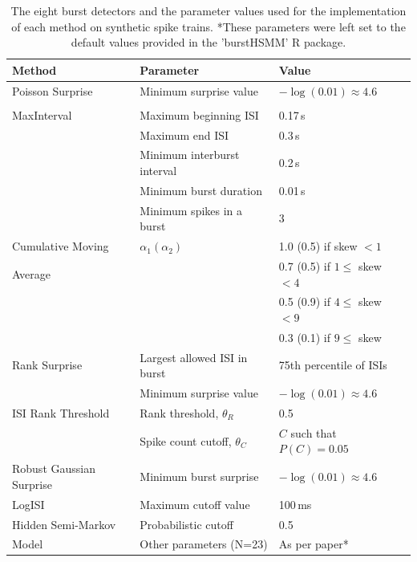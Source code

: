 \documentclass[12pt, titlepage]{article}
\begin{document}
			\begin{table}[h]
				\centering
				\begin{tabular}{|p{5cm}|l|l|}
					\hline
					Method & Parameter & Value
					\\ \hline 
					Poisson Surprise & Minimum surprise value & $-\log(0.01) \approx 4.6$
					\\
					 \cite{Legendy1985}&&\\ 
					\hline
					MaxInterval  & Maximum beginning ISI & 0.17$\,$s
					\\ \cite{NEmanual} & Maximum end ISI & 0.3$\,$s
					\\ & Minimum interburst interval & 0.2$\,$s
					\\ & Minimum burst duration & 0.01$\,$s
					\\& Minimum spikes in a burst & 3
					\\ \hline 
					 Cumulative Moving & $\alpha_1 (\alpha_2)$ & 1.0 (0.5) if skew $<1$
					\\ Average & &  0.7 (0.5) if $1 \leq $ skew $<4$
					\\  \cite{Kapucu2012} & & 0.5 (0.9) if $4 \leq $ skew $<9$
					\\  & & 0.3 (0.1) if  $9 \leq$ skew 
					\\ \hline 
					Rank Surprise& Largest allowed ISI in burst & 75th percentile of ISIs\\
					\cite{Gourevitch2007} & Minimum surprise value& $-\log(0.01) \approx 4.6$
					\\ \hline 
				ISI Rank Threshold  & Rank threshold, $\theta_R$ & 0.5 \\
					\cite{Hennig2011} & Spike count cutoff, $\theta_C$& $C$ such that $P(C)=0.05 $
					\\ \hline
					Robust Gaussian Surprise \cite{Ko2012} & Minimum burst surprise & $-\log(0.01) \approx 4.6$
					\\ \hline    LogISI \cite{Pasquale2010} & Maximum cutoff value & 100$\,$ms
					\\ \hline
					Hidden Semi-Markov  & Probabilistic cutoff & 0.5
					\\  Model \cite{Tokdar2010}& Other parameters (N=23) & As per paper*
					\\ \hline
				\end{tabular}
				\caption{The eight burst detectors and the parameter values used for the implementation of each method on synthetic spike trains. *These parameters were left set to the default values provided in the 'burstHSMM' R package. }
				\label{param_vals}
			\end{table}
\end{document}
